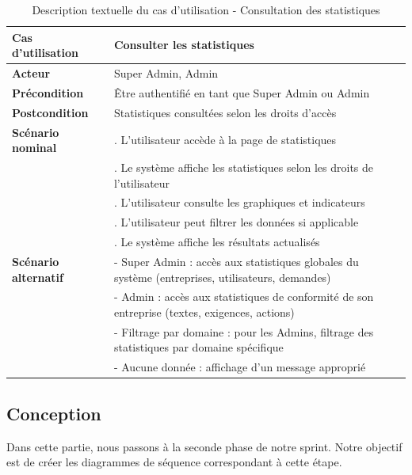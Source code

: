 \begin{longtable}{|>{\raggedright\arraybackslash}p{4cm}|>{\raggedright\arraybackslash}p{9cm}|}
\caption{Description textuelle du cas d'utilisation - Consultation des statistiques}
\label{tab:consult_statistics_usecase} \\
\hline
\textbf{Cas d'utilisation} & \textbf{Consulter les statistiques} \\
\hline
\textbf{Acteur} & Super Admin, Admin \\
\hline
\textbf{Précondition} & Être authentifié en tant que Super Admin ou Admin \\
\hline
\textbf{Postcondition} & Statistiques consultées selon les droits d'accès \\
\hline
\textbf{Scénario nominal} & 
1. L'utilisateur accède à la page de statistiques \\
& 2. Le système affiche les statistiques selon les droits de l'utilisateur \\
& 3. L'utilisateur consulte les graphiques et indicateurs \\
& 4. L'utilisateur peut filtrer les données si applicable \\
& 5. Le système affiche les résultats actualisés \\
\hline
\textbf{Scénario alternatif} & 
- Super Admin : accès aux statistiques globales du système (entreprises, utilisateurs, demandes) \\
& - Admin : accès aux statistiques de conformité de son entreprise (textes, exigences, actions) \\
& - Filtrage par domaine : pour les Admins, filtrage des statistiques par domaine spécifique \\
& - Aucune donnée : affichage d'un message approprié \\
\hline
\end{longtable}

\subsection{Conception}
\noindent Dans cette partie, nous passons à la seconde phase de notre sprint. Notre objectif est de créer les diagrammes de séquence correspondant à cette étape.


